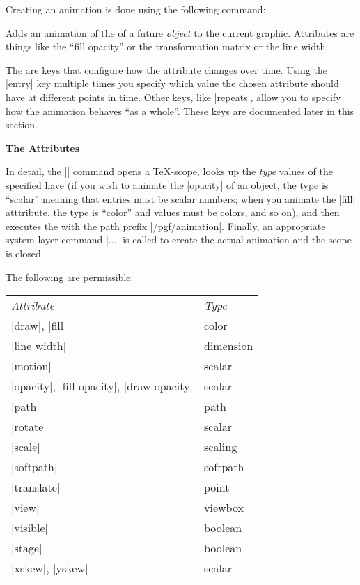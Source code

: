 Creating an animation is done using the following command:

\begin{command}{\pgfanimateattribute{}}
  Adds an animation of the  of a future \emph{object}
  to the current graphic. Attributes are things like the ``fill
  opacity'' or the transformation matrix or the line width.

  The  are keys that configure how the attribute changes
  over time. Using the |entry| key multiple times you specify which
  value the chosen attribute should have at different points in
  time. Other keys, like |repeats|, allow you to specify how the
  animation behaves ``as a whole''. These keys are documented later in
  this section.

\begin{codeexample}[]
\end{codeexample}

  \medskip
  \textbf{The Attributes}
  
  In detail, the |\pgfanimateattribute| command opens a \TeX-scope,
  looks up the \emph{type} values of the specified 
  have (if you wish to animate the |opacity| of an object, the type is
  ``scalar'' meaning that entries must be scalar numbers; when you
  animate the |fill| atttribute, the type is ``color'' and values 
  must be colors, and so on), and then executes the  with
  the path prefix |/pgf/animation|. Finally, an appropriate system
  layer command |\pgfsysanimate...| is called to create the actual
  animation and the scope is closed.

  The following  are permissible:
  
  \begin{tabular}{ll}
    \emph{Attribute} & \emph{Type} \\
    |draw|, |fill|              & color \\
    |line width|                & dimension \\
    |motion|                    & scalar \\
    |opacity|, |fill opacity|, |draw opacity|              & scalar \\
    |path|                      & path \\
    |rotate|                    & scalar \\
    |scale|                     & scaling \\
    |softpath|                  & softpath \\
    |translate|                 & point \\
    |view|                      & viewbox \\
    |visible|                   & boolean \\
    |stage|                     & boolean \\
    |xskew|, |yskew|            & scalar \\
  \end{tabular}


\end{command}
